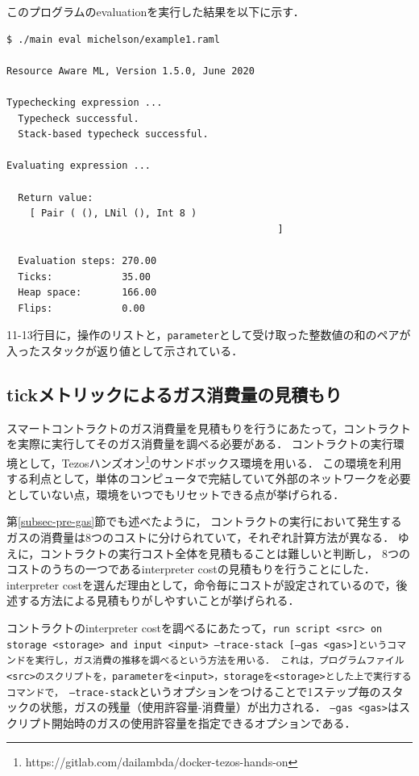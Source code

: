 \documentclass{kuisthesis}
\begin{document}
このプログラムのevaluationを実行した結果を以下に示す．

\begin{lstlisting}[basicstyle={\ttfamily\color{base}\scriptsize}]
$ ./main eval michelson/example1.raml

Resource Aware ML, Version 1.5.0, June 2020

Typechecking expression ...
  Typecheck successful.
  Stack-based typecheck successful.

Evaluating expression ...

  Return value:
    [ Pair ( (), LNil (), Int 8 )
                                               ]

  Evaluation steps: 270.00
  Ticks:            35.00
  Heap space:       166.00
  Flips:            0.00
\end{lstlisting}

11-13行目に，操作のリストと，{\tt parameter}として受け取った整数値の和のペアが入ったスタックが返り値として示されている．


\subsection{tickメトリックによるガス消費量の見積もり} \label{subsec-pro-gas}
スマートコントラクトのガス消費量を見積もりを行うにあたって，コントラクトを実際に実行してそのガス消費量を調べる必要がある．
コントラクトの実行環境として，Tezosハンズオン\footnote{https://gitlab.com/dailambda/docker-tezos-hands-on}のサンドボックス環境を用いる．
この環境を利用する利点として，単体のコンピュータで完結していて外部のネットワークを必要としていない点，環境をいつでもリセットできる点が挙げられる．

第\ref{subsec-pre-gas}節でも述べたように，
コントラクトの実行において発生するガスの消費量は8つのコストに分けられていて，それぞれ計算方法が異なる．
ゆえに，コントラクトの実行コスト全体を見積もることは難しいと判断し，
8つのコストのうちの一つであるinterpreter costの見積もりを行うことにした．
interpreter costを選んだ理由として，命令毎にコストが設定されているので，後述する方法による見積もりがしやすいことが挙げられる．

コントラクトのinterpreter costを調べるにあたって，{\tt run script <src> on storage <storage> and input <input> --trace-stack [--gas <gas>]というコマンドを実行し，ガス消費の推移を調べるという方法を用いる．
これは，プログラムファイル<src>のスクリプトを，parameterを<input>，storageを<storage>とした上で実行するコマンドで，
--trace-stack}というオプションをつけることで1ステップ毎のスタックの状態，ガスの残量（使用許容量-消費量）が出力される．
{\tt --gas <gas>}はスクリプト開始時のガスの使用許容量を指定できるオプションである．
\end{document}

